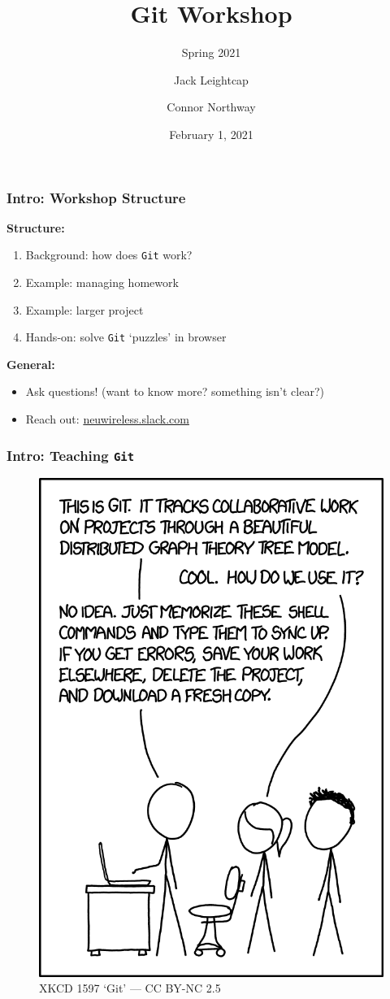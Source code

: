 \documentclass{beamer} \usetheme{Madrid}
\title{Git Workshop}
\subtitle{Spring 2021}
\author[]{Jack Leightcap\inst{1}\inst{2} \and Connor Northway\inst{2}}
\institute[IEEE, Wireless Club]{
	\inst{1}IEEE -- \url{nuieeeofficers@gmail.com}
	\and
	\inst{2}Wireless Club -- \url{nuwirelessclub@gmail.com}
}
\date[Spring 2021]{February 1, 2021}
\begin{document}
\frame{\titlepage}

\begin{frame}
	\frametitle{Intro: Workshop Structure}
	\centering \textbf{Structure:}
	\begin{enumerate}
		\setlength\itemsep{1em}
		\item Background: how does \texttt{Git} work?
		\item Example: managing homework
		\item Example: larger project
		\item Hands-on: solve \texttt{Git} `puzzles' in browser
	\end{enumerate}
	\vfill
	\centering \textbf{General:}
	\begin{itemize}
		\setlength\itemsep{1em}
		\item Ask questions!
		      (want to know more? something isn't clear?)
		\item Reach out: \url{neuwireless.slack.com}
	\end{itemize}
\end{frame}

\begin{frame}
	\frametitle{Intro: Teaching \texttt{Git}}
	\begin{figure}
		\includegraphics[height=\textheight-25mm]{xkcd.png}
		\caption{XKCD 1597 `Git' --- CC BY-NC 2.5}
	\end{figure}
\end{frame}
\end{document}
